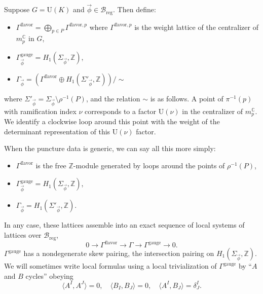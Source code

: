 \documentclass[12pt,letterpaper,reqno]{article}
\numberwithin{equation}{section}
\newcommand{\cB}{\ensuremath{\mathcal B}}
\newcommand{\C}{\ensuremath{\mathbb C}}
\newcommand{\Z}{\ensuremath{\mathbb Z}}
\newcommand{\reg}{\mathrm{reg}}
\newcommand{\gauge}{\mathrm{gauge}}
\newcommand{\flavor}{\mathrm{flavor}}
\newcommand{\IP}[1]{\langle#1\rangle}
\newcommand{\vphi}{{\vec\phi}}
\newcommand{\U}{\mathrm{U}}
\newcommand{\fixme}[1]{{\color{orange}{[#1]}}}
\begin{document}
\begin{defn}[Charge lattices for $G = \U(K)$]
Suppose $G = \U(K)$ and $\vphi \in \cB_\reg$. 
Then define:
\begin{itemize}
 \item $\Gamma^\flavor = \bigoplus_{p \in P} \Gamma^{\flavor,p}$ where $\Gamma^{\flavor,p}$
 is the weight lattice of the centralizer of $m^\C_p$
 in $G$,
 \item $\Gamma_\vphi^\gauge = H_1(\Sigma_\vphi, \Z)$,
 \item $\Gamma_\vphi = \left( \Gamma^\flavor \oplus H_1(\Sigma'_\vphi,\Z) \right) / \sim$
\end{itemize}
where $\Sigma'_\vphi = \Sigma_\vphi \setminus \rho^{-1}(P)$,
and the relation $\sim$ is as follows. A point of $\pi^{-1}(p)$ with ramification index $\nu$ corresponds to a factor $\U(\nu)$ in the centralizer of $m_p^\C$. We identify a clockwise 
loop around this point with the weight of the 
determinant representation of this $\U(\nu)$ factor.
\end{defn}

\begin{example}[Charge lattices for $G = \U(K)$ with generic puncture data]
When the puncture data is generic, we can say all this
more simply:
\begin{itemize}
 \item $\Gamma^\flavor$ is the free $\Z$-module generated
by loops around the points of $\rho^{-1}(P)$,
 \item $\Gamma_\vphi^\gauge = H_1(\Sigma_\vphi, \Z)$,
 \item $\Gamma_\vphi = H_1(\Sigma'_\vphi, \Z)$.
\end{itemize}
\end{example}

\fixme{discuss $SU(K)$ case}

In any case, these lattices assemble into an exact 
sequence of local systems of lattices over $\cB_\reg$,
\begin{equation} \label{eq:lattice-extension}
0 \to \Gamma^\flavor \to \Gamma \to \Gamma^\gauge \to 0.
\end{equation}
$\Gamma^\gauge$ has a nondegenerate skew pairing,
the intersection pairing on $H_1(\Sigma_\vphi, \Z)$.
We will sometimes write local formulas using a local
trivialization of $\Gamma^\gauge$ by ``$A$ and $B$ cycles''
obeying
\begin{equation}
  \IP{A^I, A^J}=0, \quad \IP{B_I, B_J}=0, \quad \IP{A^I,B_J} = \delta^I_J.
\end{equation}
\end{document}
